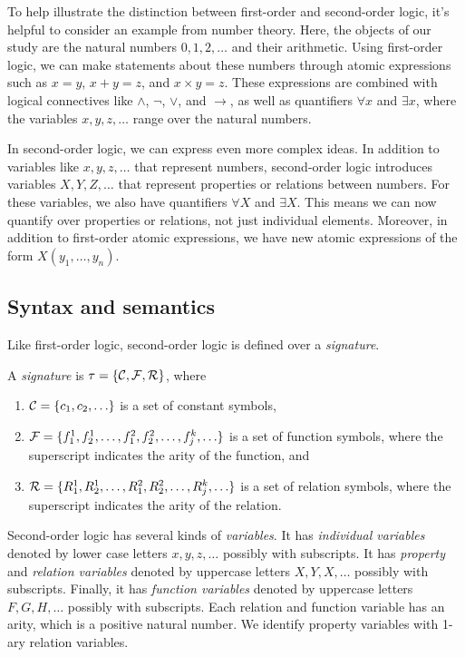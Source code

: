 \documentclass[11pt,twoside=off,numbers=noenddot]{scrbook}
\begin{document}
To help illustrate the distinction between first-order and second-order logic, it's helpful to consider an example from number theory. Here, the objects of our study are the natural numbers $0, 1, 2, \dots$ and their arithmetic. Using first-order logic, we can make statements about these numbers through atomic expressions such as $x = y$, $x + y = z$, and $x \times y = z$. These expressions are combined with logical connectives like $\wedge$, $\neg$, $\vee$, and $\rightarrow$, as well as quantifiers $\forall x$ and $\exists x$, where the variables $x, y, z, \dots$ range over the natural numbers.

In second-order logic, we can express even more complex ideas. In addition to variables like $x, y, z, \dots$ that represent numbers, second-order logic introduces variables $X, Y, Z, \dots$ that represent properties or relations between numbers. For these variables, we also have quantifiers $\forall X$ and $\exists X$. This means we can now quantify over properties or relations, not just individual elements. Moreover, in addition to first-order atomic expressions, we have new atomic expressions of the form $X(y_1, \dots, y_n)$.

\subsection{Syntax and semantics}
Like first-order logic, second-order logic is defined over a \emph{signature}.

\begin{definition}
  A \emph{signature} is $\tau = \{ \mathcal{C}, \mathcal{F}, \mathcal{R} \}$, where
  \begin{enumerate}
    \item $\consts = \set{c_1, c_2, \dots}$ is a set of constant symbols,
    \item $\funcs = \set{f_1^1, f_2^1, \dots, f_1^2, f_2^2, \dots, f_j^k, \dots}$ is a set of function symbols, where the superscript indicates the arity of the function, and
    \item $\rels = \set{R_1^1, R_2^1, \dots, R_1^2, R_2^2, \dots, R_j^k, \dots}$ is a set of relation symbols, where the superscript indicates the arity of the relation.
  \end{enumerate}
\end{definition}

Second-order logic has several kinds of \emph{variables}. It has \emph{individual variables} denoted by lower case letters $x, y, z, \dots$ possibly with subscripts. It has \emph{property} and \emph{relation variables} denoted by uppercase letters $X, Y, X, \dots$ possibly with subscripts. Finally, it has \emph{function variables} denoted by uppercase letters $F, G, H, \dots$ possibly with subscripts. Each relation and function variable has an arity, which is a positive natural number. We identify property variables with 1-ary relation variables.
\end{document}
